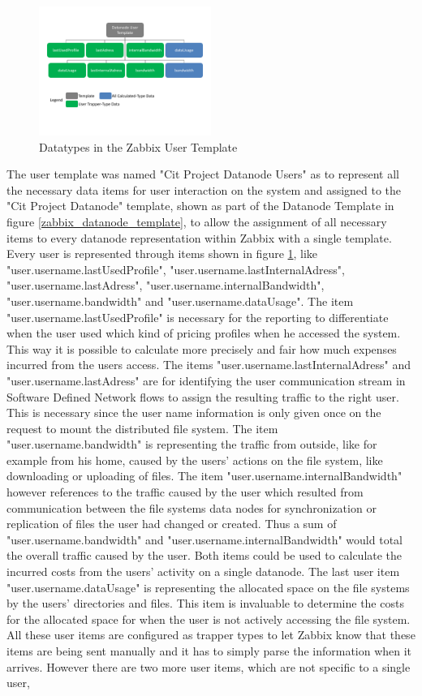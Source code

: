 \begin{figure}[ht]
\centering
\includegraphics[width=0.5\textwidth]{img/ZabbixUserTemp} 

\caption{Datatypes in the Zabbix User Template}
\label{zabbix_user_template}
\end{figure}	
	The user template was named "Cit Project Datanode Users" as to represent all the necessary data items for user interaction on the system and assigned to the "Cit Project Datanode" template, shown as part of the Datanode Template in figure \ref{zabbix_datanode_template}, to allow the assignment of all necessary items to every datanode representation within Zabbix with a single template. Every user is represented through items shown in figure \ref{zabbix_user_template}, like "user.username.lastUsedProfile", "user.username.lastInternalAdress", "user.username.lastAdress", "user.username.internalBandwidth", "user.username.bandwidth" and "user.username.dataUsage". The item "user.username.lastUsedProfile" is necessary for the reporting to differentiate when the user used which kind of pricing profiles when he accessed the system. This way it is possible to calculate more precisely and fair how much expenses incurred from the users access. The items "user.username.lastInternalAdress" and "user.username.lastAdress" are for identifying the user communication stream in Software Defined Network flows to assign the resulting traffic to the right user. This is necessary since the user name information is only given once on the request to mount the distributed file system. The item "user.username.bandwidth" is representing the traffic from outside, like for example from his home, caused by the users' actions on the file system, like downloading or uploading of files. The item "user.username.internalBandwidth" however references to the traffic caused by the user which resulted from communication between the file systems data nodes for synchronization or replication of files the user had changed or created. Thus a sum of "user.username.bandwidth" and "user.username.internalBandwidth" would total the overall traffic caused by the user. Both items could be used to calculate the incurred costs from the users' activity on a single datanode. The last user item "user.username.dataUsage" is representing the allocated space on the file systems by the users' directories and files. This item is invaluable to determine the costs for the allocated space for when the user is not actively accessing the file system. All these user items are configured as trapper types to let Zabbix know that these items are being sent manually and it has to simply parse the information when it arrives. However there are two more user items, which are not specific to a single user, 
